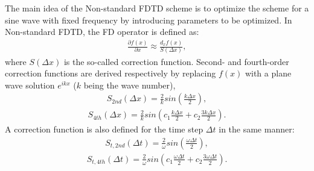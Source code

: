             The main idea of the Non-standard FDTD scheme is to optimize the scheme for a sine wave with fixed frequency by introducing parameters to be optimized.
In Non-standard FDTD, the FD operator is defined as:
            \begin{align} \label{eq:fdtd_7}
                \frac{\partial f(x)}{\partial x} \approx \frac{d_x f(x)}{S(\Delta x)},
            \end{align}
            where $S(\Delta x)$ is the so-called correction function. Second- and fourth-order correction functions are derived respectively by replacing $f(x)$
with a plane wave solution $e^{ikx}$ ($k$ being the wave number),
            \begin{align} \label{eq:fdtd_8}
                S_{2nd}(\Delta x) = \frac{2}{k} sin(\frac{k \Delta x}{2}),
            \end{align}
\vspace*{-7mm}
            \begin{align} \label{eq:fdtd_9}
                S_{4th}(\Delta x) = \frac{2}{k} sin(c_1 \frac{k \Delta x}{2} + c_2 \frac{3k \Delta x}{2}).
            \end{align}
            A correction function is also defined for the time step $\Delta t$ in the same manner:
            \begin{align} \label{eq:fdtd_10}
                S_{t,2nd}(\Delta t)=\frac{2}{\omega}sin\left( \frac{\omega\Delta t}{2} \right),
            \end{align}
\vspace*{-7mm}
            \begin{align} \label{eq:fdtd_11}
                S_{t,4th}(\Delta t)=\frac{2}{\omega}sin\left( c_1\frac{\omega\Delta t}{2} + c_2\frac{3\omega \Delta t}{2} \right).
            \end{align}

